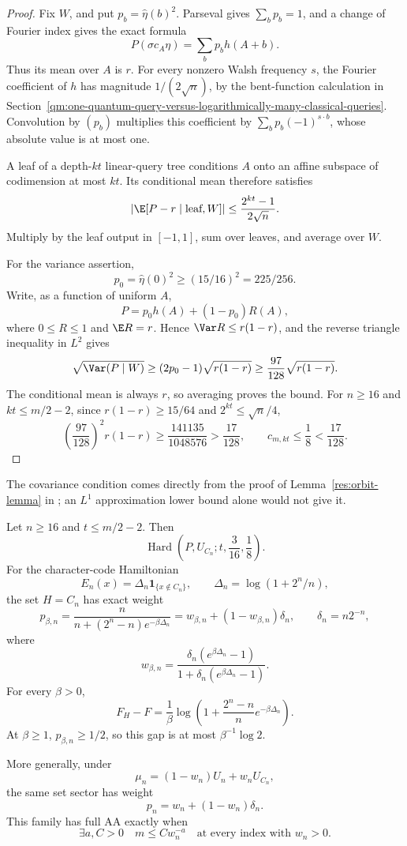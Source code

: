 \begin{proof}
Fix \(W\), and put \(p_b=\widehat\eta(b)^2\). Parseval gives
\(\sum_bp_b=1\), and a change of Fourier index gives the exact formula
\[
 P(\sigma c_A\eta)=\sum_bp_bh(A+b).
\]
Thus its mean over \(A\) is \(r\). For every nonzero Walsh frequency
\(s\), the Fourier coefficient of \(h\) has magnitude
\(1/(2\sqrt n)\), by the bent-function calculation in
Section~\ref{qm:one-quantum-query-versus-logarithmically-many-classical-queries}.
Convolution by \((p_b)\) multiplies this coefficient by
\(\sum_bp_b(-1)^{s\cdot b}\), whose absolute value is at most one.

A leaf of a depth-\(kt\) linear-query tree conditions \(A\) onto an
affine subspace of codimension at most \(kt\). Its conditional mean
therefore satisfies
\[
 \left|\E[P-r\mid\text{leaf},W]\right|
 \le\frac{2^{kt}-1}{2\sqrt n}.
\]
Multiply by the leaf output in \([-1,1]\), sum over leaves, and average
over \(W\).

For the variance assertion,
\[
 p_0=\widehat\eta(0)^2\ge(15/16)^2=225/256.
\]
Write, as a function of uniform \(A\),
\[
 P=p_0h(A)+(1-p_0)R(A),
\]
where \(0\le R\le1\) and \(\E R=r\). Hence
\(\Var R\le r(1-r)\), and the reverse triangle inequality in \(L^2\)
gives
\[
 \sqrt{\Var(P\mid W)}
 \ge(2p_0-1)\sqrt{r(1-r)}
 \ge\frac{97}{128}\sqrt{r(1-r)}.
\]
The conditional mean is always \(r\), so averaging proves the bound.
For \(n\ge16\) and \(kt\le m/2-2\), since \(r(1-r)\ge15/64\) and
\(2^{kt}\le\sqrt n/4\),
\[
 \left(\frac{97}{128}\right)^2r(1-r)
 \ge\frac{141135}{1048576}>\frac{17}{128},
 \qquad c_{m,kt}\le\frac18<\frac{17}{128}.
\]
\end{proof}

The covariance condition comes directly from the proof of
Lemma~\ref{res:orbit-lemma} in
; an
\(L^1\) approximation lower bound alone would not give it.

\begin{proposition}
\label{ian:hard-sector-character-instance}
Let \(n\ge16\) and \(t\le m/2-2\). Then
\[
 \operatorname{Hard}\left(P,U_{C_n};t,\frac3{16},\frac18\right).
\]
For the character-code Hamiltonian
\[
 E_n(x)=\Delta_n\mathbf1_{\{x\notin C_n\}},\qquad
 \Delta_n=\log(1+2^n/n),
\]
the set \(H=C_n\) has exact weight
\[
 p_{\beta,n}
 =\frac{n}{n+(2^n-n)e^{-\beta\Delta_n}}
 =w_{\beta,n}+(1-w_{\beta,n})\delta_n,
 \qquad \delta_n=n2^{-n},
\]
where
\[
 w_{\beta,n}
 =\frac{\delta_n(e^{\beta\Delta_n}-1)}
        {1+\delta_n(e^{\beta\Delta_n}-1)}.
\]
For every \(\beta>0\),
\[
 F_H-F
 =\frac1\beta\log\left(
 1+\frac{2^n-n}{n}e^{-\beta\Delta_n}\right).
\]
At \(\beta\ge1\), \(p_{\beta,n}\ge1/2\), so this gap is at most
\(\beta^{-1}\log2\).

More generally, under
\[
 \mu_n=(1-w_n)U_n+w_nU_{C_n},
\]
the same set sector has weight
\[
 p_n=w_n+(1-w_n)\delta_n.
\]
This family has full AA exactly when
\[
 \exists a,C>0\quad
 m\le Cw_n^{-a}\quad\text{at every index with }w_n>0.
\]
\end{proposition}


